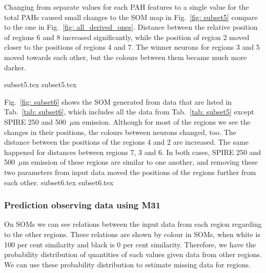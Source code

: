             Changing from separate values for each PAH features to a single value for the total PAHs caused small changes to the SOM map in Fig.~\ref{fig: subset5} compare to the one in Fig.~\ref{fig: all_derived_ones}. 
            Distance between the relative position of regions 6 and 8 increased significantly, while the position of region 2 moved closer to the positions of regions 4 and 7.
            The winner neurons for regions 3 and 5 moved towards each other, but the colours between them became much more darker. 

            {subset5.tex}
            {subset5.tex}

            Fig.~\ref{fig: subset6} shows the SOM generated from data that are listed in Tab.~\ref{tab: subset6}, which includes all the data from Tab.~\ref{tab: subset5} except SPIRE 250 and 500~$\mu$m emission.
            Although for most of the regions we see the changes in their positions, the colours between neurons changed, too. 
            The distance between the positions of the regions 4 and 2 are increased.
            The same happened for distances between regions 7, 3 and 6.
            In both cases, SPIRE 250 and 500~$\mu$m emission of these regions are similar to one another, and removing these two parameters from input data moved the positions of the regions further from each other. 
            {subset6.tex}
            {subset6.tex}
            
            \subsubsection{Prediction observing data using M31}
        
                On SOMs we can see relations between the input data from each region regarding to the other regions.
                These relations are shown by colour in SOMs, when white is 100 per cent similarity and black is 0 per cent similarity.
                Therefore, we have the probability distribution of quantities of each values given data from other regions.
                We can use these probability distribution to estimate missing data for regions. 
                
